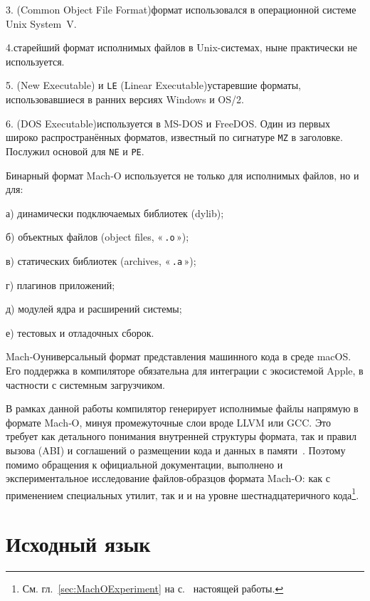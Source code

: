 \documentclass[utf8]{lgu}
\newcommand{\tire}{\unskip\nobreak\thinspace\textemdash\thinspace}
\newcommand{\code}[1]{{\normalsize\texttt{#1}}}
\begin{document}
3.\hspace{0.5em}\code{COFF} (Common Object File Format)\tire формат использовался в операционной системе Unix System~V.

4.\hspace{0.5em}\code{A.out}\tire старейший формат исполнимых файлов в Unix-системах, ныне практически не используется.

5.\hspace{0.5em}\code{NE} (New Executable) и \code{LE} (Linear Executable)\tire устарев\-шие форматы, использовавшиеся в ранних версиях Windows и OS/2.

6.\hspace{0.5em}\code{MZ} (DOS Executable)\tire используется в MS-DOS и Free\-DOS. Один из первых широко распространённых форматов, известный по сигнатуре \code{MZ} в заголовке. Послужил основой для \code{NE} и \code{PE}.

Бинарный формат Mach‑O используется не только для исполнимых файлов, но и для:

а) динамически подключаемых библиотек (dylib);

б) объектных файлов (object files, «\,\code{.o}\,»);

в) статических библиотек (archives, «\,\code{.a}\,»);

г) плагинов приложений;

д) модулей ядра и расширений системы;

е) тестовых и отладочных сборок.

Mach‑O\tire универсальный формат представления машинного кода в среде macOS. Его поддержка в компиляторе обязательна для интеграции с экосистемой Apple, в частности с системным загрузчиком.

В рамках данной работы компилятор генерирует исполнимые файлы напрямую в формате Mach‑O, минуя промежуточные слои вроде LLVM или GCC. Это требует как детального понимания внутренней структуры формата, так и правил вызова (ABI) и соглашений о размещении кода и данных в памяти~\cite{AppleSecurity}. Поэтому помимо обращения к официальной документации, выполнено и экспериментальное исследование файлов-образцов формата Mach‑O: как с применением специальных утилит, так и и на уровне шестнадцатеричного кода\footnote{См. гл.~\ref{sec:MachOExperiment} на с.~\pageref{sec:MachOExperiment} настоящей работы.}.

\section{Исходный язык}
\end{document}

